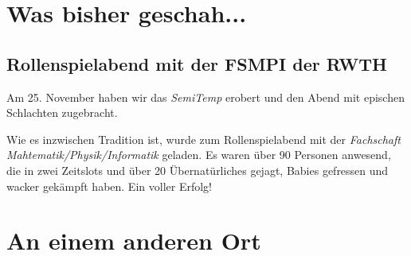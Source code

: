 
%



\usepackage{seqsplit}
\usepackage{xstring}
%


\multiauthor{} %




%



\makemultititle
%

\section{Was bisher geschah...}

\subsection{Rollenspielabend mit der FSMPI der RWTH}
Am 25. November haben wir das \textit{SemiTemp} erobert und den Abend mit epischen Schlachten zugebracht.

Wie es inzwischen Tradition ist, wurde zum Rollenspielabend mit der \textit{Fachschaft Mahtematik/Physik/Informatik} geladen.
Es waren über 90 Personen anwesend, die in zwei Zeitslots und über 20 Übernatürliches gejagt, Babies gefressen und wacker gekämpft haben.
Ein voller Erfolg!

\section{An einem anderen Ort}

